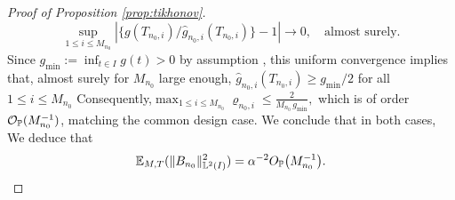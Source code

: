 \documentclass{article}
\begin{document}
\begin{proof}[Proof of Proposition \ref{prop:tikhonov}]
$$
\sup_{1\leq i\leq M_{n_0}}|\{g(T_{n_0,i})/\widehat g_{n_0,i}(T_{n_0,i})\} - 1 | \rightarrow 0,\quad \text{almost surely}.
$$
Since $g_{\min} := \inf_{t\in I} g(t) > 0$ by assumption , this uniform convergence implies that, almost surely for $M_{n_0}$ large enough, $\widehat{g}_{n_0,i}(T_{n_0,i}) \geq g_{\min}/2$ for all $1\leq i \leq M_{n_0}$
Consequently,$\max_{1\leq i \leq M_{n_0}} \varrho_{n_0,i} \leq \frac{2}{M_{n_0}\, g_{\min}},$ which is of order $\mathcal{O}_{\mathbb{P}}(M_{n_0}^{-1})$, matching the common design case. We conclude that in both cases,
We deduce that 
\begin{equation}\label{error_term_contrib}
	\mathbb{E}_{M,T}(\|B_{n_0}\|^2_{\mathbb{L}^2(I)})  =  \alpha^{-2}O_{\mathbb P}\big( M_{n_0}^{-1}\big).
\end{equation}
\color{black}


\end{proof}
\end{document}

